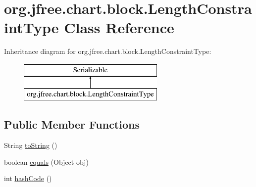 \hypertarget{classorg_1_1jfree_1_1chart_1_1block_1_1_length_constraint_type}{}\section{org.\+jfree.\+chart.\+block.\+Length\+Constraint\+Type Class Reference}
\label{classorg_1_1jfree_1_1chart_1_1block_1_1_length_constraint_type}
Inheritance diagram for org.\+jfree.\+chart.\+block.\+Length\+Constraint\+Type\+:\begin{figure}[H]
\begin{center}
\leavevmode
\includegraphics[height=2.000000cm]{classorg_1_1jfree_1_1chart_1_1block_1_1_length_constraint_type}
\end{center}
\end{figure}
\subsection*{Public Member Functions}
\begin{DoxyCompactItemize}
\item 
String \mbox{\hyperlink{classorg_1_1jfree_1_1chart_1_1block_1_1_length_constraint_type_a2d3c3c21e2f11173774f55e605912842}{to\+String}} ()
\item 
boolean \mbox{\hyperlink{classorg_1_1jfree_1_1chart_1_1block_1_1_length_constraint_type_a0a356bd746733c315c7c0e4c7c5a1e92}{equals}} (Object obj)
\item 
int \mbox{\hyperlink{classorg_1_1jfree_1_1chart_1_1block_1_1_length_constraint_type_a5b0a91dec5adbb87ec566a52338cad1e}{hash\+Code}} ()
\end{DoxyCompactItemize}
